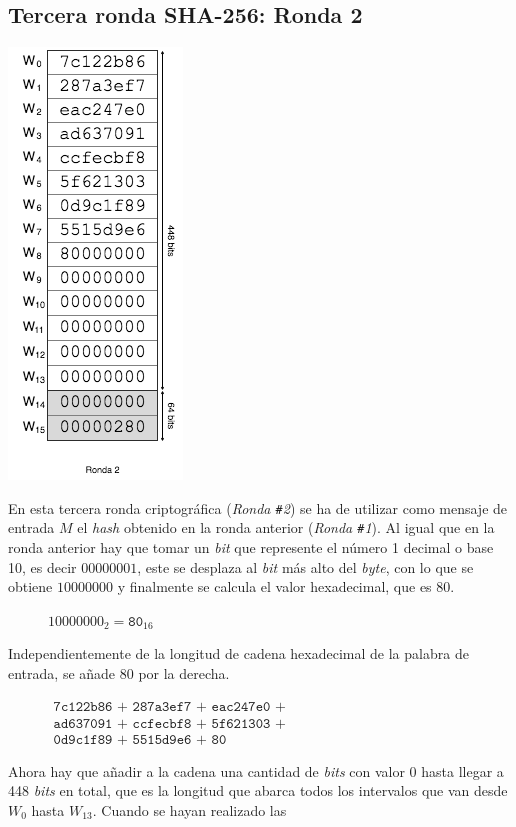 \documentclass{article}
\begin{document}
        \subsection{Tercera ronda SHA-256: Ronda 2}
        \noindent\begin{minipage}{0.23\textwidth}
        \includegraphics[scale=0.59]{img/Bitcoin_block_SHA_256_W0_W15_ronda_2}
        \end{minipage}
        \hfill
        \begin{minipage}{0.67\textwidth}
        En esta tercera ronda criptográfica (\textit{Ronda \texttt{\#}2}) se ha de utilizar como mensaje de entrada $M$ el \textit{hash} obtenido en la ronda anterior (\textit{Ronda \texttt{\#}1}). Al igual que en la ronda anterior hay que tomar un \textit{bit} que represente el número 1 decimal o base 10, es decir $00000001$, este se desplaza al \textit{bit} más alto del \textit{byte}, con lo que se obtiene $10000000$ y finalmente se calcula el valor hexadecimal, que es $80$.
            \begin{figure}[H]
            \centering
                $10000000_{2} = \texttt{80}_{16}$
            \end{figure}
        Independientemente de la longitud de cadena hexadecimal de la palabra de entrada, se añade $80$ por la derecha.
        \begin{figure}[H]
        \centering
            $\begin{array}{l}
                \texttt{7c122b86 + 287a3ef7 + eac247e0 +} \\
                \texttt{ad637091 + ccfecbf8 + 5f621303 +} \\
                \texttt{0d9c1f89 + 5515d9e6 + 80 }
            \end{array}$
        \end{figure}
        Ahora hay que añadir a la cadena una cantidad de \textit{bits} con valor $0$ hasta llegar a 448 \textit{bits} en total, que es la longitud que abarca todos los intervalos que van desde $W_{0}$ hasta $W_{13}$. Cuando se hayan realizado las
        \end{minipage}
        
\end{document}
